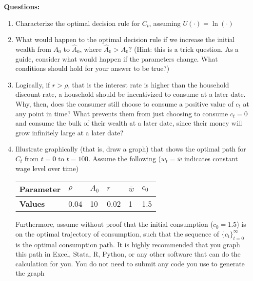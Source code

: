 \documentclass[letter,11pt]{article}
\begin{document}
\begin{enumerate}
\textbf{Questions:}
\begin{enumerate}
\item Characterize the optimal decision rule for $C_t$, assuming $U(\cdot)=\ln(\cdot)$
\item What would happen to the optimal decision rule if we increase the initial wealth from $A_0$ to $\hat{A}_0$, where $\hat{A}_0>A_0$? (Hint: this is a trick question. As a guide, consider what would happen if the parameters change. What conditions should hold for your answer to be true?)
\item Logically, if $r > \rho$, that is the interest rate is higher than the household discount rate, a household should be incentivized to consume at a later date. Why, then, does the consumer still choose to consume a positive value of $c_t$ at any point in time? What prevents them from just choosing to consume $c_t=0$ and consume the bulk of their wealth at a later date, since their money will grow infinitely large at a later date?
\item Illustrate graphically (that is, draw a graph) that shows the optimal path for $C_t$ from $t=0$ to $t=100$. Assume the following ($w_t = \bar{w}$ indicates constant wage level over time)
\begin{table}[htbp]
\centering
\begin{tabular}{p{3cm}  P{0.8cm} P{0.8cm} P{0.8cm} P{0.8cm} P{0.8cm}}
\hline\hline
\textbf{Parameter} 	& $\rho$ 	& $A_0$	& $r$ 	& $\bar{w}$ 	& $c_0$ \\  
\hline
\textbf{Values} 		&  0.04 	& 10		& 0.02	& 1		&1.5 \\ 
\hline\hline
\end{tabular}
\end{table}

Furthermore, assume without proof that the initial consumption ($c_0=1.5$) is on the optimal trajectory of consumption, such that the sequence of $\{c_t\}_{t=0}^{\infty}$ is the optimal consumption path. It is highly recommended that you graph this path in Excel, Stata, R, Python, or any other software that can do the calculation for you. You do not need to submit any code you use to generate the graph
\end{enumerate}

\end{enumerate}
\end{document}
